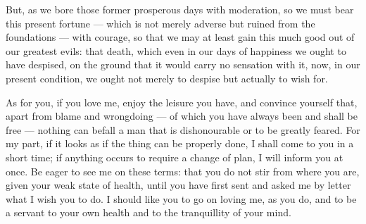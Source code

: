  But, as we bore those former prosperous days with moderation, so we must bear this present fortune --- which is not merely adverse but ruined from the foundations --- with courage, so that we may at least gain this much good out of our greatest evils: that death, which even in our days of happiness we ought to have despised, on the ground that it would carry no sensation with it, now, in our present condition, we ought not merely to despise but actually to wish for.

 As for you, if you love me, enjoy the leisure you have, and convince yourself that, apart from blame and wrongdoing --- of which you have always been and shall be free --- nothing can befall a man that is dishonourable or to be greatly feared. For my part, if it looks as if the thing can be properly done, I shall come to you in a short time; if anything occurs to require a change of plan, I will inform you at once. Be eager to see me on these terms: that you do not stir from where you are, given your weak state of health, until you have first sent and asked me by letter what I wish you to do. I should like you to go on loving me, as you do, and to be a servant to your own health and to the tranquillity of your mind.
